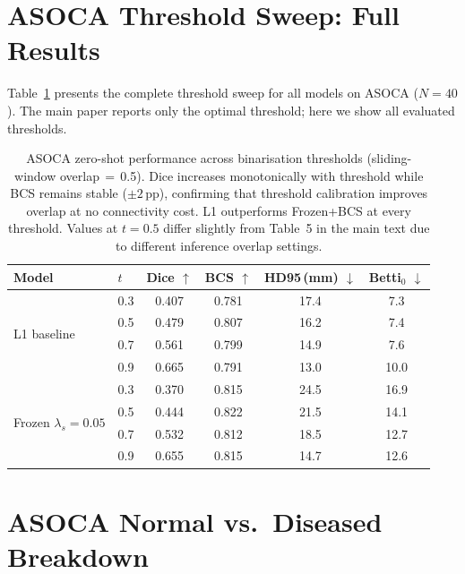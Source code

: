 \documentclass[runningheads]{llncs}
\begin{document}

\section{ASOCA Threshold Sweep: Full Results}
\label{sec:asoca_threshold}

Table~\ref{tab:threshold_full} presents the complete threshold sweep for all models on ASOCA ($N{=}40$). The main paper reports only the optimal threshold; here we show all evaluated thresholds.

\begin{table}[h]
\caption{ASOCA zero-shot performance across binarisation thresholds (sliding-window overlap$\,{=}\,$0.5). Dice increases monotonically with threshold while BCS remains stable (${\pm}2$\,pp), confirming that threshold calibration improves overlap at no connectivity cost. L1 outperforms Frozen+BCS at every threshold. Values at $t{=}0.5$ differ slightly from Table~5 in the main text due to different inference overlap settings.}
\label{tab:threshold_full}
\centering
\small
\begin{tabular}{llcccc}
\toprule
Model & $t$ & Dice $\uparrow$ & BCS $\uparrow$ & HD95\,(mm) $\downarrow$ & Betti$_0$ $\downarrow$ \\
\midrule
\multirow{4}{*}{L1 baseline}
 & 0.3 & 0.407 & 0.781 & 17.4 & 7.3 \\
 & 0.5 & 0.479 & 0.807 & 16.2 & 7.4 \\
 & 0.7 & 0.561 & 0.799 & 14.9 & 7.6 \\
 & 0.9 & 0.665 & 0.791 & 13.0 & 10.0 \\
\midrule
\multirow{4}{*}{Frozen $\lambda_s{=}0.05$}
 & 0.3 & 0.370 & 0.815 & 24.5 & 16.9 \\
 & 0.5 & 0.444 & 0.822 & 21.5 & 14.1 \\
 & 0.7 & 0.532 & 0.812 & 18.5 & 12.7 \\
 & 0.9 & 0.655 & 0.815 & 14.7 & 12.6 \\
\bottomrule
\end{tabular}
\end{table}

\section{ASOCA Normal vs.\ Diseased Breakdown}
\label{sec:asoca_subgroups}
\end{document}

